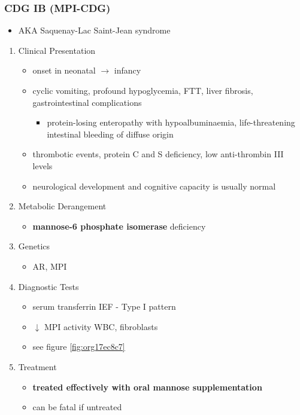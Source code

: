 \documentclass[12pt]{scrartcl}
\begin{document}
\subsubsection{CDG IB (MPI-CDG)}
\label{sec:org290a09e}
\begin{itemize}
\item AKA Saquenay-Lac Saint-Jean syndrome
\end{itemize}
\begin{enumerate}
\item Clinical Presentation
\label{sec:org95b0122}
\begin{itemize}
\item onset in neonatal \(\to\) infancy
\item cyclic vomiting, profound hypoglycemia, FTT, liver
fibrosis, gastrointestinal complications
\begin{itemize}
\item protein-losing enteropathy with hypoalbuminaemia, life-threatening
intestinal bleeding of diffuse origin
\end{itemize}
\item thrombotic events, protein C and S deficiency, low anti-thrombin III levels
\item neurological development and cognitive capacity is usually normal
\end{itemize}

\item Metabolic Derangement
\label{sec:org5be166d}
\begin{itemize}
\item \textbf{mannose-6 phosphate isomerase} deficiency
\end{itemize}


\item Genetics
\label{sec:orgb01cc9b}
\begin{itemize}
\item AR, MPI
\end{itemize}

\item Diagnostic Tests
\label{sec:org37f5b7b}
\begin{itemize}
\item serum transferrin IEF - Type I pattern
\item \(\downarrow\) MPI activity WBC, fibroblasts
\item see figure \ref{fig:org17ec8c7}
\end{itemize}
\item Treatment
\label{sec:org86a2964}
\begin{itemize}
\item \textbf{treated effectively with oral mannose supplementation}
\item can be fatal if untreated
\end{itemize}
\end{enumerate}
\end{document}
